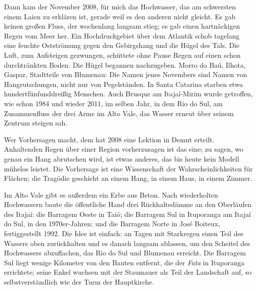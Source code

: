 \documentclass[
  ngerman,
  11pt,
  openany]{book}
\begin{document}
Dann kam der November 2008, für mich das Hochwasser, das am schwersten
einem Laien zu erklären ist, gerade weil es den anderen nicht gleicht.
Es gab keinen großen Fluss, der wochenlang langsam stieg; es gab einen
hartnäckigen Regen vom Meer her. Ein Hochdruckgebiet über dem Atlantik
schob tagelang eine feuchte Ostströmung gegen den Gebirgshang und die
Hügel des Tals. Die Luft, zum Aufsteigen gezwungen, schüttete ohne Pause
Regen auf einen schon durchtränkten Boden. Die Hügel begannen
nachzugeben. Morro do Baú, Ilhota, Gaspar, Stadtteile von Blumenau: Die
Namen jenes Novembers sind Namen von Hangrutschungen, nicht nur von
Pegelständen. In Santa Catarina starben etwa hundertfünfunddreißig
Menschen. Auch Brusque am Itajaí-Mirim wurde getroffen, wie schon 1984
und wieder 2011, im selben Jahr, in dem Rio do Sul, am Zusammenfluss der
drei Arme im Alto Vale, das Wasser erneut über seinem Zentrum steigen
sah.

Wer Vorhersagen macht, dem hat 2008 eine Lektion in Demut erteilt.
Anhaltenden Regen über einer Region vorherzusagen ist das eine; zu
sagen, wo genau ein Hang abrutschen wird, ist etwas anderes, das bis
heute kein Modell mühelos leistet. Die Vorhersage ist eine Wissenschaft
der Wahrscheinlichkeiten für Flächen; die Tragödie geschieht an einem
Hang, in einem Haus, in einem Zimmer.

Im Alto Vale gibt es außerdem ein Erbe aus Beton. Nach wiederholten
Hochwassern baute die öffentliche Hand drei Rückhaltedämme an den
Oberläufen des Itajaí: die Barragem Oeste in Taió; die Barragem Sul in
Ituporanga am Itajaí do Sul, in den 1970er-Jahren; und die Barragem
Norte in José Boiteux, fertiggestellt 1992. Die Idee ist einfach: an
Tagen mit Starkregen einen Teil des Wassers oben zurückhalten und es
danach langsam ablassen, um den Scheitel des Hochwassers abzuflachen,
das Rio do Sul und Blumenau erreicht. Die Barragem Sul liegt wenige
Kilometer von den Bauten entfernt, die der \emph{Fata} in Ituporanga
errichtete; seine Enkel wuchsen mit der Staumauer als Teil der
Landschaft auf, so selbstverständlich wie der Turm der Hauptkirche.
\end{document}
